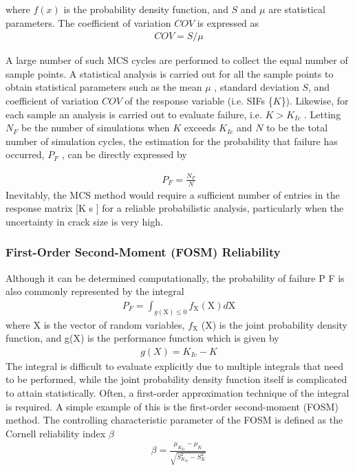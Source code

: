 \documentclass[12pt]{article}
\begin{document}
where $f(x)$ is the probability density function, and $S$ and $\mu$ are statistical parameters. The coefficient of variation $COV$ is expressed as
\begin{align*}
    COV = S/\mu \tag{29}
\end{align*}

A large number of such MCS cycles are performed to collect the equal number of sample points. A statistical analysis is 
carried out for all the sample points to obtain statistical parameters such as the mean $\mu$ , standard deviation $S$, and coefficient of
variation $COV$ of the response variable (i.e. SIFs \{$K$\}). Likewise, for each sample an analysis is carried out to evaluate failure,
i.e. $K > K_{Ic}$ . Letting $N_F$ be the number of simulations when $K$ exceeds $K_{Ic}$ and $N$ to be the total number of simulation cycles, the
estimation for the probability that failure has occurred, $P_F$ , can be directly expressed by

\begin{align*}
    P_F = \frac{N_F}{N} \tag{30}
\end{align*}
Inevitably, the MCS method would require a sufficient number of entries in the response matrix [K s ] for a reliable 
probabilistic analysis, particularly when the uncertainty in crack size is very high.

\subsubsection{First-Order Second-Moment (FOSM) Reliability}
Although it can be determined computationally, the probability of failure P F is also commonly represented by the integral
\begin{align*}
    P_F = \int_{g(\text{X}) \le 0} f_{\text{X}}(\text{X})d\text{X} \tag{31}
\end{align*}
where X is the vector of random variables, $f_\text{X}$ (X) is the joint probability density function, and g(X) is the performance function
which is given by
\begin{align*}
    g(X) = K_{Ic} - K
\end{align*}
The integral is difficult to evaluate explicitly due to multiple integrals that need to be performed, while the joint
probability density function itself is complicated to attain statistically. Often, a first-order approximation technique of the
integral is required. A simple example of this is the first-order second-moment (FOSM) method. The controlling 
characteristic parameter of the FOSM is defined as the Cornell reliability index $\beta$
\begin{align*}
    \beta = \frac{\mu_{K_{Ic}}-\mu_K}{\sqrt{S_{K_{Ic}}^2 - S_K^2}} \tag{32}
\end{align*}
\end{document}
